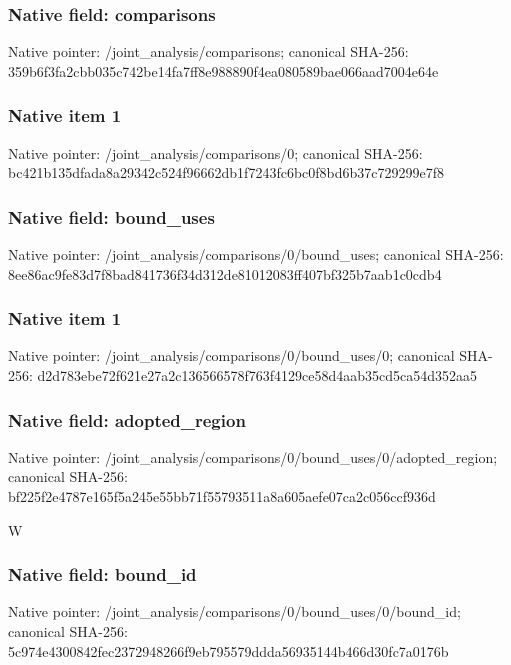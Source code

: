 \documentclass[10pt,a4paper]{article}
\begin{document}
\subsubsection{Native field: comparisons}
Native pointer: /joint\_\allowbreak{}analysis/comparisons; canonical SHA-256: 359b6f3fa2cbb035c742be14fa7ff8e988890f4ea080589bae066aad7004e64e

\subsubsection{Native item 1}
Native pointer: /joint\_\allowbreak{}analysis/comparisons/0; canonical SHA-256: bc421b135dfada8a29342c524f96662db1f7243fc6bc0f8bd6b37c729299e7f8

\subsubsection{Native field: bound\_\allowbreak{}uses}
Native pointer: /joint\_\allowbreak{}analysis/comparisons/0/bound\_\allowbreak{}uses; canonical SHA-256: 8ee86ac9fe83d7f8bad841736f34d312de81012083ff407bf325b7aab1c0cdb4

\subsubsection{Native item 1}
Native pointer: /joint\_\allowbreak{}analysis/comparisons/0/bound\_\allowbreak{}uses/0; canonical SHA-256: d2d783ebe72f621e27a2c136566578f763f4129ce58d4aab35cd5ca54d352aa5

\subsubsection{Native field: adopted\_\allowbreak{}region}
Native pointer: /joint\_\allowbreak{}analysis/comparisons/0/bound\_\allowbreak{}uses/0/adopted\_\allowbreak{}region; canonical SHA-256: bf225f2e4787e165f5a245e55bb71f55793511a8a605aefe07ca2c056ccf936d

\begingroup\raggedright\sloppy W\par\endgroup

\subsubsection{Native field: bound\_\allowbreak{}id}
Native pointer: /joint\_\allowbreak{}analysis/comparisons/0/bound\_\allowbreak{}uses/0/bound\_\allowbreak{}id; canonical SHA-256: 5c974e4300842fec2372948266f9eb795579ddda56935144b466d30fc7a0176b
\end{document}
